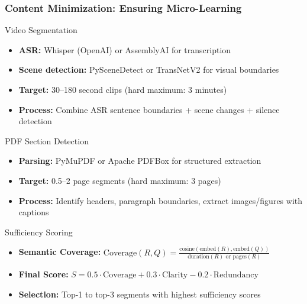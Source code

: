 \documentclass[aspectratio=169]{beamer}
\begin{document}
\begin{frame}
\frametitle{Content Minimization: Ensuring Micro-Learning}
\begin{block}{Video Segmentation}
\begin{itemize}
\item \textbf{ASR:} Whisper (OpenAI) or AssemblyAI for transcription
\item \textbf{Scene detection:} PySceneDetect or TransNetV2 for visual boundaries
\item \textbf{Target:} 30--180 second clips (hard maximum: 3 minutes)
\item \textbf{Process:} Combine ASR sentence boundaries + scene changes + silence detection
\end{itemize}
\end{block}

\begin{block}{PDF Section Detection}
\begin{itemize}
\item \textbf{Parsing:} PyMuPDF or Apache PDFBox for structured extraction
\item \textbf{Target:} 0.5--2 page segments (hard maximum: 3 pages)
\item \textbf{Process:} Identify headers, paragraph boundaries, extract images/figures with captions
\end{itemize}
\end{block}

\begin{block}{Sufficiency Scoring}
\begin{itemize}
\item \textbf{Semantic Coverage:} $\text{Coverage}(R, Q) = \frac{\text{cosine}(\text{embed}(R), \text{embed}(Q))}{\text{duration}(R) \text{ or } \text{pages}(R)}$
\item \textbf{Final Score:} $S = 0.5 \cdot \text{Coverage} + 0.3 \cdot \text{Clarity} - 0.2 \cdot \text{Redundancy}$
\item \textbf{Selection:} Top-1 to top-3 segments with highest sufficiency scores
\end{itemize}
\end{block}
\end{frame}
\end{document}

